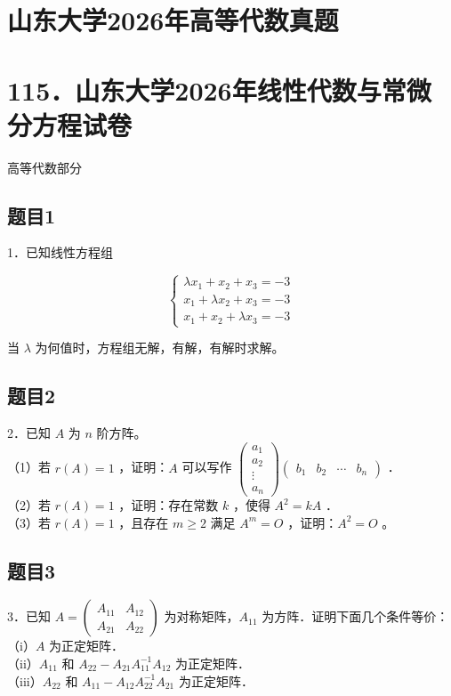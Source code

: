 \documentclass{article}
\begin{document}
\section*{山东大学2026年高等代数真题}
\section*{115．山东大学2026年线性代数与常微分方程试卷}
高等代数部分\\

\subsection{题目1}
1．已知线性方程组

\[
\left\{\begin{array}{l}
\lambda x_{1}+x_{2}+x_{3}=-3 \\
x_{1}+\lambda x_{2}+x_{3}=-3 \\
x_{1}+x_{2}+\lambda x_{3}=-3
\end{array}\right.
\]

当 \(\lambda\) 为何值时，方程组无解，有解，有解时求解。\\

\subsection{题目2}
2．已知 \(A\) 为 \(n\) 阶方阵。\\
（1）若 \(r(A)=1\) ，证明：\(A\) 可以写作 \(\left(\begin{array}{c}a_{1} \\ a_{2} \\ \vdots \\ a_{n}\end{array}\right)\left(\begin{array}{llll}b_{1} & b_{2} & \cdots & b_{n}\end{array}\right)\) ．\\
（2）若 \(r(A)=1\) ，证明：存在常数 \(k\) ，使得 \(A^{2}=k A\) ．\\
（3）若 \(r(A)=1\) ，且存在 \(m \geq 2\) 满足 \(A^{m}=O\) ，证明：\(A^{2}=O\) 。\\

\subsection{题目3}
3．已知 \(A=\left(\begin{array}{cc}A_{11} & A_{12} \\ A_{21} & A_{22}\end{array}\right)\) 为对称矩阵，\(A_{11}\) 为方阵．证明下面几个条件等价：\\
（i）\(A\) 为正定矩阵．\\
（ii）\(A_{11}\) 和 \(A_{22}-A_{21} A_{11}^{-1} A_{12}\) 为正定矩阵．\\
（iii）\(A_{22}\) 和 \(A_{11}-A_{12} A_{22}^{-1} A_{21}\) 为正定矩阵．\\
\end{document}
